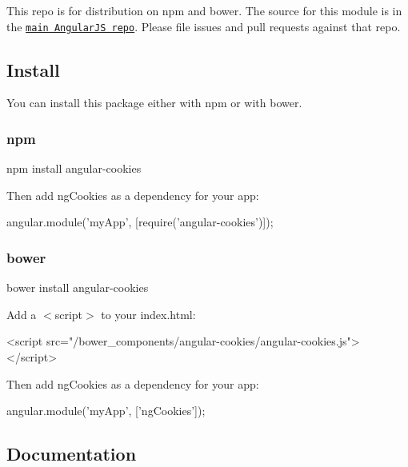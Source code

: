 This repo is for distribution on {\ttfamily npm} and {\ttfamily bower}. The source for this module is in the \href{https://github.com/angular/angular.js/tree/master/src/ngCookies}{\tt main Angular\+JS repo}. Please file issues and pull requests against that repo.

\subsection*{Install}

You can install this package either with {\ttfamily npm} or with {\ttfamily bower}.

\subsubsection*{npm}


\begin{DoxyCode}
npm install angular-cookies
\end{DoxyCode}


Then add {\ttfamily ng\+Cookies} as a dependency for your app\+:


\begin{DoxyCode}
angular.module('myApp', [require('angular-cookies')]);
\end{DoxyCode}


\subsubsection*{bower}


\begin{DoxyCode}
bower install angular-cookies
\end{DoxyCode}


Add a {\ttfamily $<$script$>$} to your {\ttfamily index.\+html}\+:


\begin{DoxyCode}
<script src="/bower\_components/angular-cookies/angular-cookies.js"></script>
\end{DoxyCode}


Then add {\ttfamily ng\+Cookies} as a dependency for your app\+:


\begin{DoxyCode}
angular.module('myApp', ['ngCookies']);
\end{DoxyCode}


\subsection*{Documentation}

